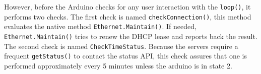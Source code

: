 However, before the Arduino checks for any user interaction with the \verb|loop()|, it performs two checks.
The first check is named \verb|checkConnection()|, this method evaluates the native method \verb|Ethernet.Maintain()|.
If needed, \verb|Ethernet.Maintain()| tries to renew the DHCP lease and reports back the result.\newline
The second check is named \verb|CheckTimeStatus|. Because the servers require a frequent \verb|getStatus()| to contact the status API, this check assures that one is performed approximately every 5 minutes unless the arduino is in state 2.


